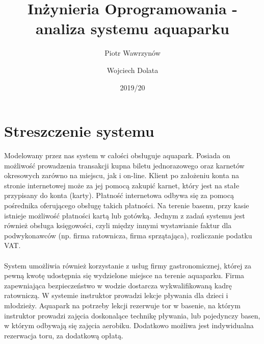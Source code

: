 \documentclass[a4paper,11pt]{article}
\title{Inżynieria Oprogramowania - analiza systemu aquaparku}
\date{2019/20}
\author{Piotr Wawrzynów \and Wojciech Dolata}
\begin{document}
\newcommand{\pspec}[4]{#1 \\wejście: #2 \\wyjście: #3 \\działanie: #4}

\maketitle
\newpage



\tableofcontents
\newpage


 
\section{Streszczenie systemu}
Modelowany przez nas system w całości obsługuje aquapark. Posiada on możliwość prowadzenia transakcji kupna biletu jednorazowego oraz karnetów okresowych zarówno na miejscu, jak i on-line. Klient po założeniu konta na stronie internetowej może za jej pomocą zakupić karnet, który jest na stałe przypisany do konta (karty). Płatność internetowa odbywa się za pomocą pośrednika oferującego obsługę takich płatności. Na terenie basenu, przy kasie istnieje możliwość płatności kartą lub gotówką. Jednym z zadań systemu jest również obsługa księgowości, czyli między innymi wystawianie faktur dla podwykonawców (np. firma ratownicza, firma sprzątająca), rozliczanie podatku VAT.\\ \\
System umożliwia również korzystanie z usług firmy gastronomicznej, której za pewną kwotę udostępnia się wydzielone miejsce na terenie aquaparku. Firma zapewniająca bezpieczeństwo w wodzie dostarcza wykwalifikowaną kadrę ratowniczą. W systemie instruktor prowadzi lekcje pływania dla dzieci i młodzieży. Aquapark na potrzeby lekcji rezerwuje tor w basenie, na którym instruktor prowadzi zajęcia doskonalące technikę pływania, lub pojedynczy basen, w którym odbywają się zajęcia aerobiku. Dodatkowo możliwa jest indywidualna rezerwacja toru, za dodatkową opłatą.
\newpage
\end{document}
